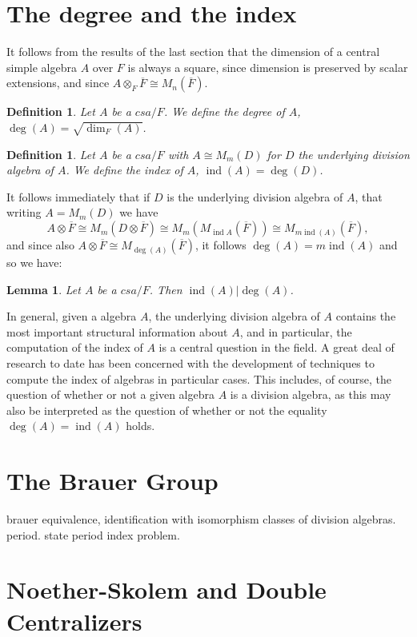 \documentclass[12pt]{report}
\theoremstyle{plain}
\newtheorem{defn}[thm]{Definition}
\newtheorem{lem}[thm]{Lemma}
\newcommand{\oper}[1]{\operatorname{#1}}
\newcommand{\ov}{\overline}
\newcommand{\ind}{\oper{ind}}
\newcommand{\todo}[1]{\textcolor{todo}{#1}}
\begin{document}
\section{The degree and the index}

It follows from the results of the last section that the dimension of a
central simple algebra $A$ over $F$ is always a square, since dimension is
preserved by scalar extensions, and since $A \otimes_F \ov F \cong M_n(\ov
F)$.

\begin{defn}
Let $A$ be a $csa/F$. We define the degree of $A$, $\deg(A) = \sqrt{\dim_F(A)}$.
\end{defn}

\begin{defn}
Let $A$ be a $csa/F$ with $A \cong M_m(D)$ for $D$ the underlying division
algebra of $A$. We define the index of $A$, $\ind(A) = \deg(D)$.
\end{defn}

It follows immediately that if $D$ is the underlying division algebra of
$A$, that writing $A = M_m(D)$ we have 
\[A \otimes \ov F \cong M_m(D \otimes \ov F) \cong M_m(M_{\ind A}(\ov F))
\cong M_{m \ind(A)}(\ov F), \] 
and since also $A \otimes \ov F \cong M_{\deg(A)}(\ov F)$, it follows
$\deg(A) = m \ind(A)$ and so we have:
\begin{lem}
Let $A$ be a $csa/F$. Then $\ind(A) | \deg(A)$.
\end{lem}

In general, given a algebra $A$, the underlying division algebra of $A$
contains the most important structural information about $A$, and in
particular, the computation of the index of $A$ is a central question in
the field. A great deal of research to date has been concerned with the
development of techniques to compute the index of algebras in particular
cases. This includes, of course, the question of whether or not a given
algebra $A$ is a division algebra, as this may also be interpreted as the
question of whether or not the equality $\deg(A) = \ind(A)$ holds.

\section{The Brauer Group}

\todo{
brauer equivalence, identification with isomorphism classes of division
algebras. period. state period index problem.
}

\section{Noether-Skolem and Double Centralizers}
\end{document}
